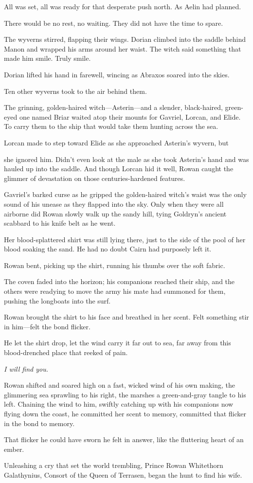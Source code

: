 All was set, all was ready for that desperate push north. As Aelin had planned.

There would be no rest, no waiting. They did not have the time to spare.

The wyverns stirred, flapping their wings. Dorian climbed into the saddle behind Manon and wrapped his arms around her waist. The witch said something that made him smile. Truly smile.

Dorian lifted his hand in farewell, wincing as Abraxos soared into the skies.

Ten other wyverns took to the air behind them.

The grinning, golden-haired witch---Asterin---and a slender, black-haired, green-eyed one named Briar waited atop their mounts for Gavriel, Lorcan, and Elide. To carry them to the ship that would take them hunting across the sea.

Lorcan made to step toward Elide as she approached Asterin's wyvern, but

she ignored him. Didn't even look at the male as she took Asterin's hand and was hauled up into the saddle. And though Lorcan hid it well, Rowan caught the glimmer of devastation on those centuries-hardened features.

Gavriel's barked curse as he gripped the golden-haired witch's waist was the only sound of his unease as they flapped into the sky. Only when they were all airborne did Rowan slowly walk up the sandy hill, tying Goldryn's ancient scabbard to his knife belt as he went.

Her blood-splattered shirt was still lying there, just to the side of the pool of her blood soaking the sand. He had no doubt Cairn had purposely left it.

Rowan bent, picking up the shirt, running his thumbs over the soft fabric.

The coven faded into the horizon; his companions reached their ship, and the others were readying to move the army his mate had summoned for them, pushing the longboats into the surf.

Rowan brought the shirt to his face and breathed in her scent. Felt something stir in him---felt the bond flicker.

He let the shirt drop, let the wind carry it far out to sea, far away from this blood-drenched place that reeked of pain.

\emph{I will find you.}

Rowan shifted and soared high on a fast, wicked wind of his own making, the glimmering sea sprawling to his right, the marshes a green-and-gray tangle to his left. Chaining the wind to him, swiftly catching up with his companions now flying down the coast, he committed her scent to memory, committed that flicker in the bond to memory.

That flicker he could have sworn he felt in answer, like the fluttering heart of an ember.

Unleashing a cry that set the world trembling, Prince Rowan Whitethorn Galathynius, Consort of the Queen of Terrasen, began the hunt to find his wife.
